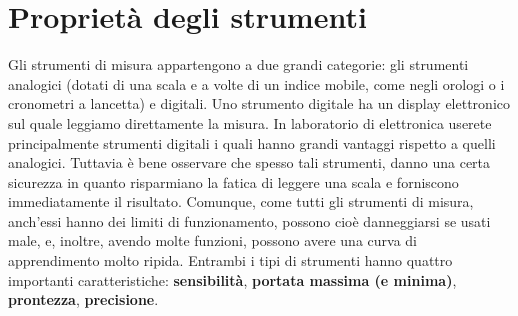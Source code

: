 \section{Proprietà degli strumenti}
Gli strumenti di misura appartengono a due grandi categorie: gli strumenti analogici (dotati di una scala e a volte di un indice mobile, come negli orologi o i cronometri a lancetta) e digitali. Uno strumento digitale ha un display elettronico sul quale leggiamo direttamente la misura. In laboratorio di elettronica userete principalmente strumenti digitali i quali hanno grandi vantaggi rispetto a quelli analogici. Tuttavia è bene osservare che spesso tali strumenti, danno una certa sicurezza in quanto risparmiano la fatica di leggere una scala e  forniscono immediatamente il risultato. Comunque, come tutti gli strumenti di misura, anch'essi hanno dei limiti di funzionamento, possono cioè danneggiarsi se usati male, e, inoltre, avendo molte funzioni, possono avere una curva di apprendimento molto ripida.  Entrambi i tipi di strumenti hanno quattro importanti caratteristiche: \textbf{sensibilità}, \textbf{portata massima (e minima)}, \textbf{prontezza}, \textbf{precisione}. 
